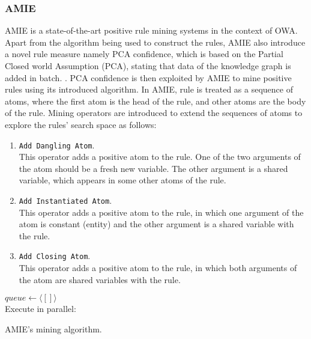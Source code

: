 \subsubsection{AMIE}
AMIE \cite{} is a state-of-the-art positive rule mining systems in the context of OWA. Apart from the algorithm being used to construct the rules, AMIE also introduce a novel rule measure namely PCA confidence, which is based on the Partial Closed world Assumption (PCA), stating that data of the knowledge graph is added in batch.
.
PCA confidence is then exploited by AMIE to mine positive rules using its introduced algorithm. In AMIE, rule is treated as a sequence of atoms, where the first atom is the head of the rule, and other atoms are the body of the rule. Mining operators are introduced to extend the sequences of atoms to explore the rules' search space as follows:
\begin{enumerate}
\item \texttt{Add Dangling Atom}.\\
  This operator adds a positive atom to the rule. One of the two arguments of the atom should be a fresh new variable. The other argument is a shared variable, which appears in some other atoms of the rule.
\item \texttt{Add Instantiated Atom}.\\
  This operator adds a positive atom to the rule, in which one argument of the atom is constant (entity) and the other argument is a shared variable with the rule.
\item \texttt{Add Closing Atom}.\\
  This operator adds a positive atom to the rule, in which both arguments of the atom are shared variables with the rule.
\end{enumerate}
\begin{algorithm}[H]
\DontPrintSemicolon
$queue\leftarrow \langle[]\rangle$\\
Execute in parallel:\\
\caption{AMIE's mining algorithm.}
\label{algor:amie}
\end{algorithm}
